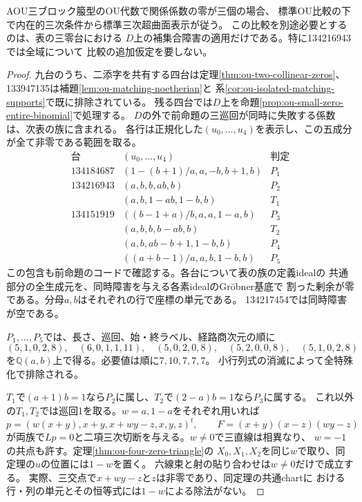 \begin{theorem}[三零係数型の全特殊化]
\label{thm:ou-three-zero-complete-comparison}
AOU三ブロック箙型のOU代数で関係係数の零が三個の場合、
標準OU比較の下で内在的三次条件から標準三次超曲面表示が従う。
この比較を別途必要とするのは、表の三零台における
$D$上の補集合障害の適用だけである。特に134216943では全域について
比較の追加仮定を要しない。
\end{theorem}
\begin{proof}
九台のうち、二添字を共有する四台は定理\ref{thm:ou-two-collinear-zeros}、
133947135は補題\ref{lem:ou-matching-noetherian}と
系\ref{cor:ou-isolated-matching-supports}で既に排除されている。
残る四台では$D$上を命題\ref{prop:ou-small-zero-entire-binomial}で処理する。
$D$の外で前命題の三巡回が同時に失敗する係数は、次表の族に含まれる。
各行は正規化した$(u_0,\ldots,u_4)$を表示し、この五成分が全て非零である範囲を取る。
\[
\begin{array}{r|l|c}
\text{台}&(u_0,\ldots,u_4)&\text{判定}\\\hline
134184687&(1-(b+1)/a,a,-b,b+1,b)&P_1\\
134216943&(a,b,b,ab,b)&P_2\\
         &(a,b,1-ab,1-b,b)&T_1\\
134151919&((b-1+a)/b,a,a,1-a,b)&P_3\\
         &(a,b,b,b-ab,b)&T_2\\
         &(a,b,ab-b+1,1-b,b)&P_4\\
         &((a+b-1)/a,a,b,1-b,b)&P_5
\end{array}
\]
この包含も前命題のコードで確認する。各台について表の族の定義idealの
共通部分の全生成元を、同時障害を与える各素idealのGröbner基底で
割った剰余が零である。分母$a,b$はそれぞれの行で座標の単元である。
134217454では同時障害が空である。

$P_1,\ldots,P_5$では、長さ、巡回、始・終ラベル、経路商次元の順に
\[
 (5,1,0,2,8),\quad(6,0,1,1,11),\quad(5,0,2,0,8),\quad
 (5,2,0,0,8),\quad(5,1,0,2,8)
\]
を$\mathbb Q(a,b)$上で得る。必要値は順に$7,10,7,7,7$。
小行列式の消滅によって全特殊化で排除される。

$T_1$で$(a+1)b=1$なら$P_2$に属し、$T_2$で$(2-a)b=1$なら$P_3$に属する。
これ以外の$T_1,T_2$では巡回1を取る。$w=a,1-a$をそれぞれ用いれば
\[
 p=(w(x+y),x+y,x+wy-z,x,y,z)^t,\qquad
 F=(x+y)(x-z)(wy-z)
\]
が両族で$Lp=0$と二項三次切断を与える。$w\ne0$で三直線は相異なり、
$w=-1$の共点も許す。定理\ref{thm:ou-four-zero-triangle}の
$X_0,X_1,X_2$を同じ$w$で取り、同定理の$u$の位置には$1-w$を置く。
六線束と射の貼り合わせは$w\ne0$だけで成立する。
実際、三交点で$x+wy-z$と$z$は非零であり、同定理の共通chartに
おける行・列の単元とその恒等式には$1-w$による除法がない。


\end{proof}
